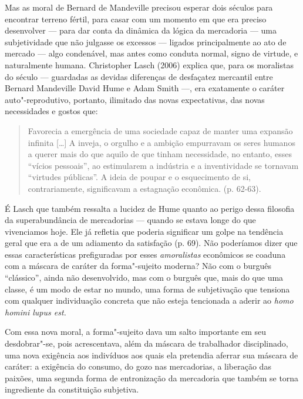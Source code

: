 Mas as moral de Bernard de Mandeville precisou esperar dois séculos para
encontrar terreno fértil, para casar com um momento em que era preciso
desenvolver --- para dar conta da dinâmica da lógica da mercadoria ---
uma subjetividade que não julgasse os excessos --- ligados
principalmente ao ato de mercado --- algo condenável, mas antes como
conduta normal, signo de virtude, e naturalmente humana. Christopher
Lasch (2006) explica que, para os moralistas do século  ---
guardadas as devidas diferenças de desfaçatez mercantil entre Bernard
Mandeville David Hume e Adam Smith ---, era exatamente o caráter
auto"-reprodutivo, portanto, ilimitado das novas expectativas, das novas
necessidades e gostos que:

\begin{quote}
Favorecia a emergência de uma sociedade capaz de manter uma expansão
infinita [\ldots{}] A inveja, o orgulho e a ambição empurravam os seres
humanos a querer mais do que aquilo de que tinham necessidade, no
entanto, esses ``vícios pessoais'', ao estimularem a indústria e a
inventividade se tornavam ``virtudes públicas''. A ideia de poupar e o
esquecimento de si, contrariamente, significavam a estagnação econômica.
(p. 62-63).
\end{quote}

É Lasch que também ressalta a lucidez de Hume quanto ao perigo dessa
filosofia da superabundância de mercadorias --- quando se estava longe
do que vivenciamos hoje. Ele já refletia que poderia significar um golpe
na tendência geral que era a de um adiamento da satisfação (p. 69). Não
poderíamos dizer que essas características prefiguradas por esses
\emph{amoralistas} econômicos se coaduna com a máscara de caráter da
forma"-sujeito moderna? Não com o burguês ``clássico'', ainda não
desenvolvido, mas com o burguês que, mais do que uma classe, é um modo
de estar no mundo, uma forma de subjetivação que tensiona com qualquer
individuação concreta que não esteja tencionada a aderir ao \emph{homo
homini lupus est.}

Com essa nova moral, a forma"-sujeito dava um salto importante em seu
desdobrar"-se, pois acrescentava, além da máscara de trabalhador
disciplinado, uma nova exigência aos indivíduos aos quais ela pretendia
aferrar sua máscara de caráter: a exigência do consumo, do gozo nas
mercadorias, a liberação das paixões, uma segunda forma de entronização
da mercadoria que também se torna ingrediente da constituição subjetiva.

